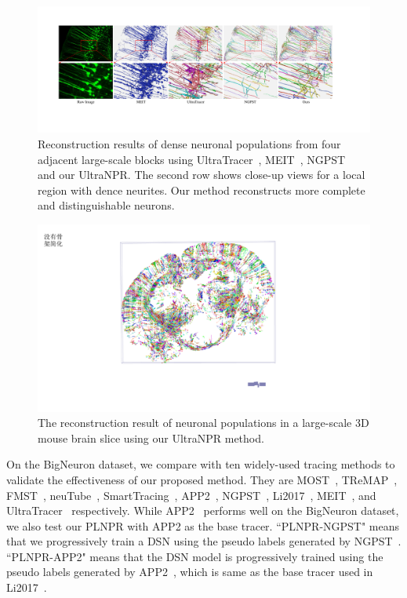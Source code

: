 \begin{figure}[t]
	\centering
	\includegraphics[width=\textwidth]{./Illustrations/comparison_ultranpr.pdf}
	\caption{Reconstruction results of dense neuronal populations from four adjacent large-scale blocks using UltraTracer~\cite{Peng2017}, MEIT~\cite{Wang2018}, NGPST~\cite{Quan2015} and our UltraNPR. The second row shows close-up views for a local region with dence neurites. Our method reconstructs more complete and distinguishable neurons. 
	}
	\label{fig:reconstruct_blocks}
\end{figure}

\begin{figure}[t]
	\centering
	\includegraphics[width=1\columnwidth]{./Illustrations/brain_slice.pdf}
	\caption{The reconstruction result of neuronal populations in a large-scale 3D mouse brain slice using our UltraNPR method.}
	\label{fig:reconstruct_brain}
\end{figure}

On the BigNeuron dataset, we compare with ten widely-used tracing methods to validate the effectiveness of our proposed method.
They are MOST~\cite{Wu2014}, TReMAP~\cite{Zhou2016}, FMST~\cite{Yang2019}, neuTube~\cite{Feng2015}, SmartTracing~\cite{Chen2015}, APP2~\cite{Xiao2013}, NGPST~\cite{Quan2015}, Li2017~\cite{Li2017}, MEIT~\cite{Wang2018}, and UltraTracer~\cite{Peng2017} respectively.
%
While APP2~\cite{Xiao2013} performs well on the BigNeuron dataset, we also test our PLNPR with APP2 as the base tracer. 
``PLNPR-NGPST" means that we progressively train a DSN using the pseudo labels generated by NGPST~\cite{Quan2015}.
``PLNPR-APP2" means that the DSN model is progressively trained using the pseudo labels generated by APP2~\cite{Xiao2013}, which is same as the base tracer used in Li2017~\cite{Li2017}.



